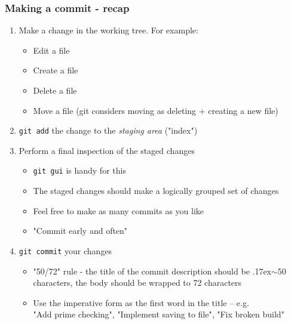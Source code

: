 

\begin{frame}[fragile]

\frametitle{Making a commit - recap}
	
\begin{enumerate}
	\item Make a change in the working tree. For example:
	\begin{itemize}
	\item Edit a file
	\item Create a file
	\item Delete a file 
	\item Move a file (git considers moving as deleting + creating a new file)
	\end{itemize}
	\item \texttt {git add} the change to the \textit{staging area} ("index")
	\item Perform a final inspection of the staged changes
	\begin{itemize}
	\item \texttt{git gui} is handy for this
	\item The staged changes should make a logically grouped set of changes
	\item Feel free to make as many commits as you like
	\item "Commit early and often"
	\end{itemize}
	\item \texttt{git commit} your changes
	\begin{itemize}
	\item  "50/72" rule - the title of the commit description should be {\raise.17ex\hbox{$\scriptstyle\sim$}}50 characters, the body should be wrapped to 72 characters
	\item Use the imperative form as the first word in the title -- e.g. \\"Add prime checking", "Implement saving to file", "Fix broken build"
	\end{itemize}
\end{enumerate}
	
\end{frame}



